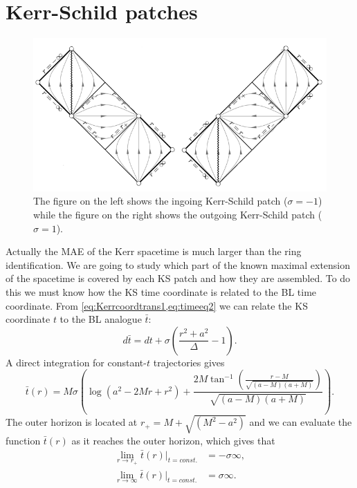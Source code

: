 \section{Kerr-Schild patches}
  \begin{figure}[hpt!] 
\begin{center}
 \centerline{\includegraphics[width=.8\textwidth]{img/Chapter2/KerrSchild.png}}
 \end{center}
 \caption{The figure on the left shows the ingoing Kerr-Schild patch ($\sigma=-1$) while the figure on the right shows the outgoing Kerr-Schild patch ($\sigma=1$).}
 \label{fig:PenroseKS}
\end{figure} 
Actually the \gls{MAE} of the Kerr spacetime is much larger than the ring identification. We are going to study which part of the known maximal extension of the spacetime is covered by each \gls{KS} patch and how they are assembled. To do this we must know how the \gls{KS} time coordinate is related to the \gls{BL} time coordinate. From \vref{eq:Kerrcoordtrans1,eq:timeeq2} we can relate the \gls{KS} coordinate $t$ to the \gls{BL} analogue $\bar{t}$:
\begin{equation}
 d\bar{t}=dt+\sigma \left(\frac{r^2+a^2}{\Delta}-1\right).
\end{equation}
A direct integration for constant-$t$ trajectories gives
  \begin{equation}
 \bar{t}(r)=M \sigma  \left(\log \left(a^2-2 M r+r^2\right)+\frac{2 M \tan^{-1}\left(\frac{r-M}{\sqrt{(a-M) (a+M)}}\right)}{\sqrt{(a-M) (a+M)}}\right).
\end{equation}
The outer horizon is located at $r_+=M+\sqrt{\left(M^2-a^2\right)}$ and we can evaluate the function $\bar{t}(r)$ as it reaches the outer horizon, which gives that
\begin{align}
 \lim_{r \to r_+}{ \bar{t}(r)}|_{t=const.} &= - \sigma \infty,\\
 \lim_{r \to \infty}{ \bar{t}(r)}|_{t=const.} &=  \sigma \infty.
\end{align}
